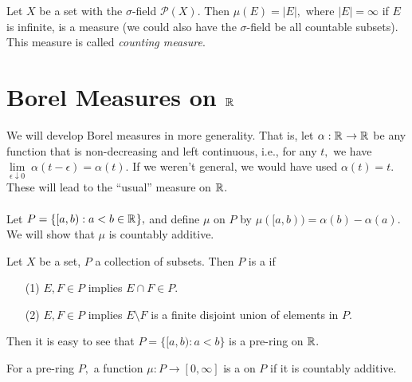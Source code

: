 \noindent\Ex Let $X$ be a set with the $\sigma$-field $\mathcal{P}(X).$ Then $\mu(E)=|E|,$ where $|E|=\infty$ if $E$ is infinite, is a measure (we could also have the $\sigma$-field be all countable subsets). This measure is called \textit{counting measure}.

\section{Borel Measures on $\mathbb{R}^{}$}
We will develop Borel measures in more generality. That is, let $\alpha:\mathbb{R}^{}\rightarrow\mathbb{R}^{}$ be any function that is non-decreasing and left continuous, i.e., for any $t,$ we have $\lim\limits_{\epsilon\downarrow 0}\;\alpha(t-\epsilon)=\alpha(t).$ If we weren't general, we would have used $\alpha(t)=t$. These will lead to the ``usual'' measure on $\mathbb{R}^{}.$ \\ \\
Let $P=\{[a,b):a<b\in\mathbb{R}^{}\},$ and define $\mu$ on $P$ by $\mu([a,b))=\alpha(b)-\alpha(a).$ We will show that $\mu$ is countably additive.

\begin{defn}
Let $X$ be a set, $P$ a collection of subsets. Then $P$ is a  if
\begin{enumerate}
\item[(1)] $E,F\in P$ implies $E\cap F\in P.$
\item[(2)] $E,F\in P$ implies $E\setminus F$ is a finite disjoint union of elements in $P.$
\end{enumerate}
\end{defn}

\noindent Then it is easy to see that $P=\{[a,b):a<b\}$ is a pre-ring on $\mathbb{R}^{}.$

\begin{defn}
For a pre-ring $P,$ a function $\mu:P\rightarrow[0,\infty]$ is a  on $P$ if it is countably additive.
\end{defn}

